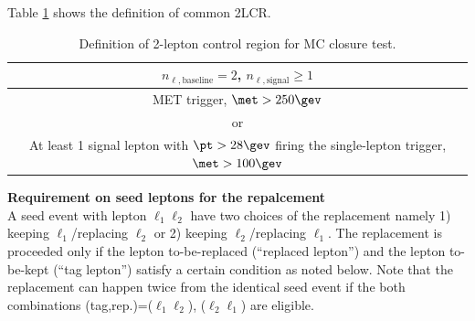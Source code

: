 Table \ref{tab::BGestimation::objRep::def2LCR} shows the definition of common 2LCR.

\begin{table}[h]
  \begin{center}
    \caption{Definition of 2-lepton control region for MC closure test.}
    \begin{tabular}{ c }
      \hline
       $n_{\ell, \mathrm{baseline}}=2$, $n_{\ell, \mathrm{signal}}\ge 1$ \\
      \hline
       MET trigger,  $\met>250\gev$   \\
       or \\
       At least 1 signal lepton with $\pt>28 \gev$ firing the single-lepton trigger, $\met>100\gev$   \\
      \hline
    \end{tabular}  \label{tab::BGestimation::objRep::def2LCR}
  \end{center}
\end{table}

\clearpage



\noindent \textbf{Requirement on seed leptons for the repalcement} \\
A seed event with lepton $\ell_1 \ell_2$ have two choices of the replacement namely 1) keeping $\ell_1$/replacing $\ell_2$ or 2) keeping $\ell_2$/replacing $\ell_1$. The replacement is proceeded only if the lepton to-be-replaced (``replaced lepton'') and the lepton to-be-kept (``tag lepton'') satisfy a certain condition as noted below. Note that the replacement can happen twice from the identical seed event if the both combinations (tag,rep.)=($\ell_1 \ell_2$), ($\ell_2 \ell_1$) are eligible. \\

